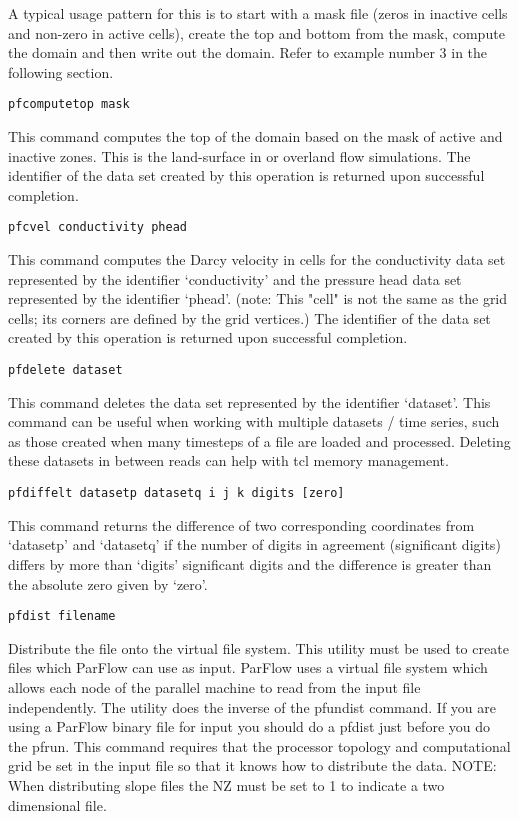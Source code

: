 \begin{description}
A typical usage pattern for this is to start with a mask file (zeros
 in inactive cells and non-zero in active cells), create the top and
 bottom from the mask, compute the domain and then write out the domain. 
 Refer to example number 3 in the following section.

\item{\begin{verbatim}pfcomputetop mask\end{verbatim}} 
This command computes the top of the domain based on the mask of
 active and inactive zones.  This is the land-surface in  or
 overland flow simulations.  The identifier of the data set created by
 this operation is returned upon successful completion.

\item{\begin{verbatim}pfcvel conductivity phead\end{verbatim}}
This command computes the Darcy velocity in cells for the conductivity data set
represented by the identifier `conductivity' and the pressure head
data set represented by the identifier `phead'.  (note: This "cell"
is not the same as the grid cells; its corners are defined by the
grid vertices.)  The identifier of the data set created by this
operation is returned upon successful completion.


\item{\begin{verbatim}pfdelete dataset\end{verbatim}}
This command deletes the data set represented by the identifier `dataset'. This
command can be useful when working with multiple datasets / time series, such as
those created when many timesteps of a file are loaded and processed.  Deleting these
datasets in between reads can help with tcl memory management.
        

\item{\begin{verbatim}pfdiffelt datasetp datasetq i j k digits [zero]\end{verbatim}}
This command returns the difference of two corresponding coordinates
from `datasetp' and `datasetq' if the number of digits in agreement
(significant digits) differs by more than `digits' significant
digits and the difference is greater than the absolute zero given     
by `zero'.


\item{\begin{verbatim}pfdist filename \end{verbatim}}
Distribute the file onto the virtual file system. This utility must be used to 
create files which ParFlow can use as input. ParFlow uses a virtual file system 
which allows each node of the parallel machine to read from the input file independently. 
The utility does the inverse of the pfundist command. If you are using a ParFlow binary 
file for input you should do a pfdist just before you do the pfrun. This command
requires that the processor topology and computational grid be set in the input 
file so that it knows how to distribute the data. NOTE: When distributing slope
files the  NZ must be set to 1 to indicate a two dimensional file.  


\end{description}
